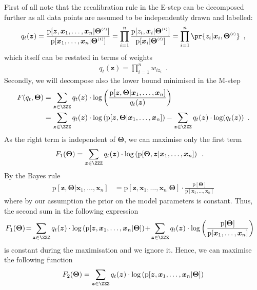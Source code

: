 \documentclass{article}
\renewcommand{\vec}[1]{\boldsymbol{#1}}
\newcommand{\pd}[1]{\mathrm{p}[#1]}
\newcommand{\supi}[1]{^{\scriptscriptstyle(#1)}}
\begin{document}
First of all note that the recalibration rule in the E-step can be decomposed further as all data points are assumed to be independently drawn and labelled:  
\begin{align*}
q_{t}(\vec{z})=\frac{\pd{\smash{\vec{z},\vec{x}_1,\ldots,\vec{x}_n|\vec{\Theta}\supi{t}}}}
{\pd{\smash{\vec{x}_1,\ldots,\vec{x}_n|\vec{\Theta}\supi{t}}}}=\prod_{i=1}^n\frac{\pd{\smash{z_i,\vec{x}_i|\vec{\Theta}\supi{t}}}}
{\pd{\smash{\vec{x}_i|\vec{\Theta}\supi{t}}}}=\prod_{i=1}^n \pr{z_i|\vec{x}_i,\vec{\Theta}\supi{t}}\enspace,
\end{align*}
which itself can be restated in terms of weights
\begin{align*}
q_{t}(\vec{z})=\prod_{i=1}^n w_{iz_i}\enspace.
\end{align*}
Secondly, we will decompose also the lower bound minimised in the M-step
\begin{align*}
F(q_{t},\vec{\Theta})%
&=\sum_{\vec{z}\in\ZZZ} q_{t}(\vec{z})\cdot
\log\left(\frac{\pd{\vec{z},\vec{\Theta}|\vec{x}_1,\ldots,\vec{x}_n}}{q_{t}(\vec{z})}\right)\\
&=\sum_{\vec{z}\in\ZZZ} q_{t}(\vec{z})\cdot
\log\left(\pd{\vec{z},\vec{\Theta}|\vec{x}_1,\ldots,\vec{x}_n}\right) 
- \sum_{\vec{z}\in\ZZZ} q_{t}(\vec{z})\cdot\log(q_{t}(\vec{z}))
\enspace.
\end{align*}
As the right term is independent of $\vec{\Theta}$, we can maximise only the first term
\begin{align*}
F_1(\vec{\Theta})&=
\sum_{\vec{z}\in\ZZZ}q_{t}(\vec{z})\cdot
\log\left(\pd{\vec{\Theta},\vec{z}|\vec{x}_1,\ldots,\vec{x}_n}\right)\enspace.
\end{align*}
By the Bayes rule
\begin{align*}
\pd{\vec{z},\vec{\Theta}|\vec{x}_1,\ldots,\vec{x}_n}
&=\pd{\vec{z},\vec{x}_1,\ldots,\vec{x}_n|\vec{\Theta}}\cdot\frac{\pd{\vec{\Theta}}}{\pd{\vec{x}_1,\ldots,\vec{x}_n}}
\end{align*}
where by our assumption the prior on the model parameters is constant. Thus, the second sum in the following expression \begin{align*}
F_1(\vec{\Theta})&\!=\!\sum_{\vec{z}\in\ZZZ}q_{t}(\vec{z})\cdot
\log\left(\pd{\vec{z},\vec{x}_1,\ldots,\vec{x}_n|\vec{\Theta}}\right)
\!+\!
\sum_{\vec{z}\in\ZZZ}q_{t}(\vec{z})\cdot
\log\left(\frac{\pd{\vec{\Theta}}}{\pd{\vec{x}_1,\ldots,\vec{x}_n}}\right)
\end{align*}
is constant during the maximisation and we ignore it. Hence, we can maximise the following function
\begin{align*}
F_{2}(\vec{\Theta})&=\sum_{\vec{z}\in\ZZZ}q_{t}(\vec{z})\cdot
\log\left(\pd{\vec{z},\vec{x}_1,\ldots,\vec{x}_n|\vec{\Theta}}\right)\\
\end{align*}
\end{document}
